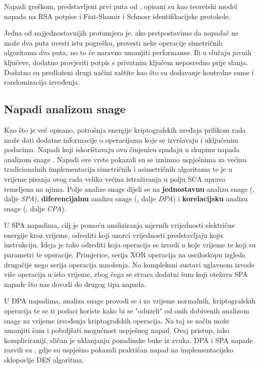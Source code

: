 \documentclass[times, utf8, diplomski]{fer}
\begin{document}
Napadi greškom, predstavljeni prvi puta od \cite{boneh1997importance}, opisani su kao teoretski model napada na RSA potpise i Fiat-Shamir i Schnorr identifikacijske protokole.

Jedna od najjednostavnijih protumjera je, ako pretpostavimo da napadač ne može dva puta uvesti istu pogrešku, provesti neke operacije simetričnih algoritama dva puta, no to će naravno umanjiti performanse. Ili u slučaju javnih ključeve, dodatno provjeriti potpis s privatnim ključem neposredno prije slanja. Dodatno su predloženi drugi načini zaštite kao što su dodavanje kontrolne sume i randomizacija izvođenja.

\subsection{Napadi analizom snage}

Kao što je već opisano, potrošnja energije kriptografskih uređaja prilikom rada može dati dodatne informacije o operacijama koje se izvršavaju i uključenim podacima. Napadi koji iskorištavaju ovu činjenicu spadaju u skupinu napada analizom snage . Napadi ove vrste pokazali su se iznimno uspješnima za većinu tradicionalnih implementacija simetričnih i asimetričnih algoritama te je u vrijeme pisanja ovog rada velika većina istraživanja u polju SCA upravo temeljena na njima. Polje analize snage dijeli se na \textbf{jednostavnu} analizu snage (, dalje \emph{SPA}), \textbf{diferencijalnu} analizu snage (, dalje \emph{DPA}) i \textbf{korelacijsku} analizu snage (, dalje \emph{CPA}).

U SPA napadima, cilj je pomoću analiziranja mjernih vrijednosti električne energije kroz vrijeme, odrediti koji uzorci vrijednosti predstavljaju koju instrukciju. Ideja je tako odrediti koja operacija se izvodi u koje vrijeme te koji su parametri te operacije. Primjerice, serija XOR operacija na osciloskopu izgleda drugačije nego serija operacija množenja. No kompleksni sustavi uglavnom izvode više operacija u isto vrijeme, zbog čega se stvara dodatni šum koji otežava SPA napade što nas dovodi do drugog tipa napada.

U DPA napadima, analiza snage provodi se i za vrijeme normalnih, kriptografskih operacija te se ti podaci koriste kako bi se "oduzeli"
od onih dobivenih analizom snage za vrijeme izvođenja kriptografskih operacija. Na taj se način može umanjiti šum i poboljšati mogućnost uspješnog napad. Ovaj pristup, iako kompliciraniji, sličan je uklanjanju pozadinske buke iz zvuka. DPA i SPA napade razvili su \cite{kocher1999differential}, gdje su uspješno pokazali praktičan napad na implementacijsko sklopovlje DES algoritma.
\end{document}
